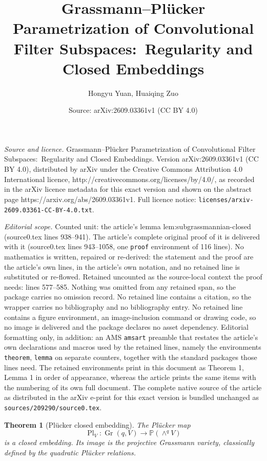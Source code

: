 \documentclass[10pt,a4paper]{amsart}
\title{Grassmann--Pl\"ucker Parametrization of Convolutional Filter Subspaces:\ Regularity and Closed Embeddings}
\author{Hongyu Yuan, Huaiqing Zuo}
\date{Source: arXiv:2609.03361v1 (CC BY 4.0)}
\newtheorem{theorem}{Theorem}
\newcommand{\Gr}{\operatorname{Gr}}
\newcommand{\PP}{\mathbb P}
\newcommand{\Pl}{\operatorname{Pl}}
\begin{document}
\maketitle

\noindent\emph{Source and licence.} Grassmann--Pl\"ucker Parametrization of Convolutional Filter Subspaces:\ Regularity and Closed Embeddings. Version arXiv:2609.03361v1 (CC BY 4.0), distributed by arXiv under the Creative Commons Attribution 4.0 International licence, http://creativecommons.org/licenses/by/4.0/, as recorded in the arXiv licence metadata for this exact version and shown on the abstract page https://arxiv.org/abs/2609.03361v1. Full licence notice: \texttt{licenses/arxiv-2609.03361-CC-BY-4.0.txt}.\par\smallskip

\noindent\textit{Editorial scope.} Counted unit: the article's lemma lem:subgrassmannian-closed (source0.tex lines 938--941). The article's complete original proof of it is delivered with it (source0.tex lines 943--1058, one \texttt{proof} environment of 116 lines). No mathematics is written, repaired or re-derived: the statement and the proof are the article's own lines, in the article's own notation, and no retained line is substituted or re-flowed.  Retained uncounted as the source-local context the proof needs: lines 577--585.  Nothing was omitted from any retained span, so the package carries no omission record.  No retained line contains a citation, so the wrapper carries no bibliography and no bibliography entry.  No retained line contains a figure environment, an image-inclusion command or drawing code, so no image is delivered and the package declares no asset dependency.  Editorial formatting only, in addition: an AMS \texttt{amsart} preamble that restates the article's own declarations and macros used by the retained lines, namely the environments \texttt{theorem}, \texttt{lemma} on separate counters, together with the standard packages those lines need.  The retained environments print in this document as Theorem 1, Lemma 1 in order of appearance, whereas the article prints the same items with the numbering of its own full document.  The complete native source of the article as distributed in the arXiv e-print for this exact version is bundled unchanged as \texttt{sources/209290/source0.tex}.
\begin{theorem}[Pl\texorpdfstring{\"u}{u}cker closed embedding]
\label{thm:Plucker-closed}
The Pl\"ucker map
\[
  \Pl_V:\Gr(q,V)\longrightarrow\PP(\wedge^qV)
\]
is a closed embedding. Its image is the projective Grassmann variety, classically
defined by the quadratic Pl\"ucker relations.
\end{theorem}
\end{document}
